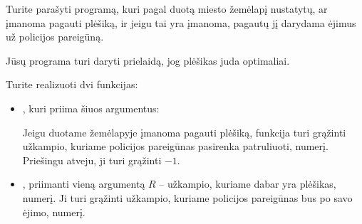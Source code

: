\documentclass{boi2014-lt}
\begin{document}
    \Task
	Turite parašyti programą, kuri pagal duotą miesto žemėlapį nustatytų,
	ar įmanoma pagauti plėšiką, ir jeigu tai yra įmanoma, pagautų jį
	darydama ėjimus už policijos pareigūną.

	Jūsų programa turi daryti prielaidą, jog plėšikas juda optimaliai.
	
	\pagebreak

    \Implementation
    Turite realizuoti dvi funkcijas:
    \begin{itemize}
        \item {}, kuri priima šiuos argumentus:

		Jeigu duotame žemėlapyje įmanoma pagauti plėšiką, funkcija 
		turi grąžinti užkampio, kuriame policijos pareigūnas pasirenka
		patruliuoti, numerį. Priešingu atveju, ji turi grąžinti $-1$.

		\item {}, priimanti vieną argumentą $R$ -- užkampio,
			kuriame dabar yra plėšikas, numerį. Ji turi grąžinti užkampio,
			kuriame policijos pareigūnas bus po savo ėjimo, numerį.
    \end{itemize}
\end{document}
